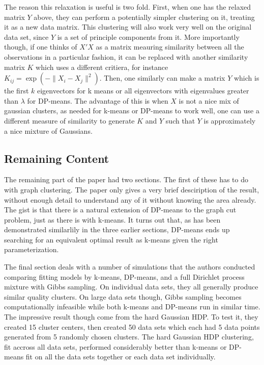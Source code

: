 \documentclass[11pt]{article}
\theoremstyle{definition}
\begin{document}
The reason this relaxation is useful is two fold. First, when one has the relaxed matrix $Y$ above, they can perform a potentially simpler clustering on it, treating it as a new data matrix. This clustering will also work very well on the original data set, since $Y$ is a set of principle components from it. More importantly though, if one thinks of $X'X$ as a matrix meauring similarity between all the observations in a particular fashion, it can be replaced with another similarity matrix $K$ which uses a different critiera, for instance $K_{ij} = \exp\left(-\|X_i-X_j\|^2\right)$. Then, one similarly can make a matrix $Y$ which is the first $k$ eigenvectors for k means or all eigenvectors with eigenvalues greater than $\lambda$ for DP-means. The advantage of this is when $X$ is not a nice mix of gaussian clusters, as needed for k-means or DP-means to work well, one can use a different measure of similarity to generate $K$ and $Y$ such that $Y$ is approximately a nice mixture of Gaussians.

\subsection{Remaining Content}
The remaining part of the paper had two sections. The first of these has to do with graph clustering. The paper only gives a very brief desciription of the result, without enough detail to understand any of it without knowing the area already. The gist is that there is a natural extension of DP-means to the graph cut problem, just as there is with k-means. It turns out that, as has been demonstrated similarlily in the three earlier sections, DP-means ends up searching for an equivalent optimal result as k-means given the right parameterization. \par
The final section deals with a number of simulations that the authors conducted comparing fitting models by k-means, DP-means, and a full Dirichlet process mixture with Gibbs sampling. On individual data sets, they all generally produce similar quality clusters. On large data sets though, Gibbs sampling becomes computationally infeasible while both k-means and DP-means run in similar time. The impressive result though come from the hard Gaussian HDP. To test it, they created 15 cluster centers, then created 50 data sets which each had 5 data points generated from 5 randomly chosen clusters. The hard Gaussian HDP clustering, fit accross all data sets, performed considerably better than k-means or DP-means fit on all the data sets together or each data set individually.
\end{document}
